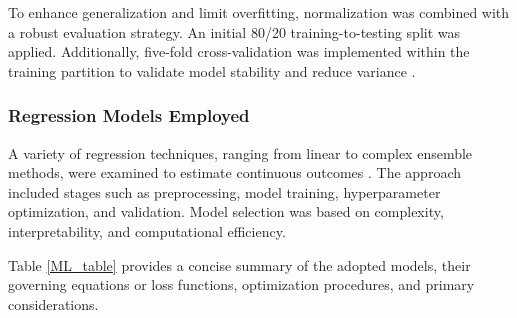 \documentclass[12pt,a4paper]{article}
\begin{document}
	\hspace{1.3cm} To enhance generalization and limit overfitting, normalization was combined with a robust evaluation strategy. An initial 80/20 training-to-testing split was applied. Additionally, five-fold cross-validation was implemented within the training partition to validate model stability and reduce variance \cite{6726842}.
	
	\subsubsection{Regression Models Employed}
	
	\hspace{1.3cm} A variety of regression techniques, ranging from linear to complex ensemble methods, were examined to estimate continuous outcomes \cite{10675076,10934398}. The approach included stages such as preprocessing, model training, hyperparameter optimization, and validation. Model selection was based on complexity, interpretability, and computational efficiency.
	
	\hspace{1.3cm} Table \ref{ML_table} provides a concise summary of the adopted models, their governing equations or loss functions, optimization procedures, and primary considerations.
	
\end{document}
